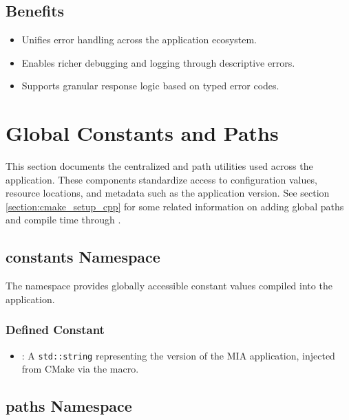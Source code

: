 \subsection{Benefits}
\begin{itemize}\itemsep0em
	\item Unifies error handling across the application ecosystem.
	\item Enables richer debugging and logging through descriptive errors.
	\item Supports granular response logic based on typed error codes.
\end{itemize}








\section{Global Constants and Paths}\label{section:global_constants_and_paths}

This section documents the centralized  and path utilities used across the application. These components standardize access to configuration values, resource locations, and metadata such as the application version. See section \ref{section:cmake_setup_cpp} for some related information on adding global paths and compile time through .

\subsection{constants Namespace}

The  namespace provides globally accessible constant values compiled into the application.

\subsubsection{Defined Constant}

\begin{itemize}\itemsep0em
	\item {}: A \texttt{std::string} representing the version of the MIA application, injected from CMake via the  macro.
\end{itemize}

\subsection{paths Namespace}

